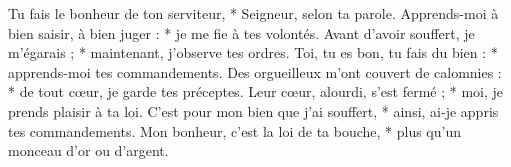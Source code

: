 Tu fais le bonheur de ton serviteur, *
Seigneur, selon ta parole.
\versseparator
Apprends-moi à bien saisir, à bien juger : *
je me fie à tes volontés.
\versseparator
Avant d’avoir souffert, je m’égarais ; *
maintenant, j’observe tes ordres.
\versseparator
Toi, tu es bon, tu fais du bien : *
apprends-moi tes commandements.
\versseparator
Des orgueilleux m’ont couvert de calomnies : *
de tout cœur, je garde tes préceptes.
\versseparator
Leur cœur, alourdi, s’est fermé ; *
moi, je prends plaisir à ta loi.
\versseparator
C’est pour mon bien que j’ai souffert, *
ainsi, ai-je appris tes commandements.
\versseparator
Mon bonheur, c’est la loi de ta bouche, *
plus qu’un monceau d’or ou d’argent.
